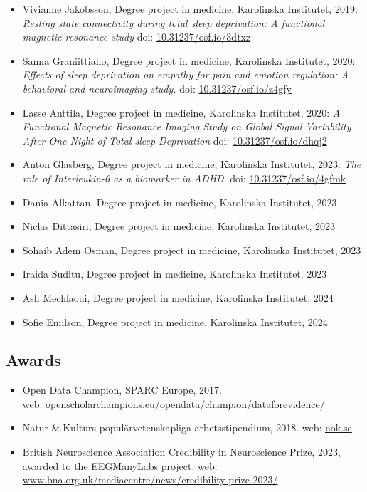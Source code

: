 \documentclass[10pt]{article}
\begin{document}
\begin{itemize}[nolistsep]
\begin{itemize}[nolistsep]
	\item Vivianne Jakobsson, Degree project in medicine, Karolinska Institutet, 2019: \emph{Resting state connectivity during total sleep deprivation: A functional magnetic resonance study} doi: \href{https://doi.org/10.31237/osf.io/3dtxz}{10.31237/osf.io/3dtxz} 
	\item Sanna Graniittiaho, Degree project in medicine, Karolinska Institutet, 2020: \emph{Effects of sleep deprivation on empathy for pain and emotion regulation: A behavioral and neuroimaging study.} doi: \href{https://doi.org/10.31237/osf.io/z4gfy}{10.31237/osf.io/z4gfy} 
	\item Lasse Anttila, Degree project in medicine, Karolinska Institutet, 2020: \emph{A Functional Magnetic Resonance Imaging Study on Global Signal Variability After One Night of Total sleep Deprivation}  doi: \href{https://doi.org/10.31237/osf.io/dhqj2}{10.31237/osf.io/dhqj2} 
	\item Anton Glasberg, Degree project in medicine, Karolinska Institutet, 2023: \emph{The role of Interleukin-6 as a biomarker in ADHD}. doi: \href{https://doi.org/10.31237/osf.io/4gfmk}{10.31237/osf.io/4gfmk} 
	\item Dania Alkattan, Degree project in medicine, Karolinska Institutet, 2023
	\item Niclas Dittasiri, Degree project in medicine, Karolinska Institutet, 2023
	\item Sohaib Adem Osman, Degree project in medicine, Karolinska Institutet, 2023
	\item Iraida Suditu, Degree project in medicine, Karolinska Institutet, 2023
	\item Ash Mechlaoui, Degree project in medicine, Karolinska Institutet, 2024
	\item Sofie Emilson, Degree project in medicine, Karolinska Institutet, 2024
	\end{itemize}
\end{itemize}

\subsection*{Awards}
\begin{itemize}[nolistsep]
\item Open Data Champion, SPARC Europe, 2017. 
\\web: \href{https://openscholarchampions.eu/opendata/champion/dataforevidence/}{openscholarchampions.eu/opendata/champion/dataforevidence/} 
\item Natur \& Kulturs populärvetenskapliga arbetsstipendium, 2018. web: \href{https://www.nok.se/priser-och-stipendier/stipendier/popularvetenskapliga-arbetsstipendier/natur--kulturs-popularvetenskapliga-pris-2018/}{nok.se} 
\item British Neuroscience Association Credibility in Neuroscience Prize, 2023, awarded to the EEGManyLabs project. web: \href{https://www.bna.org.uk/mediacentre/news/credibility-prize-2023/}{www.bna.org.uk/mediacentre/news/credibility-prize-2023/} 

\end{itemize}
\end{document}
